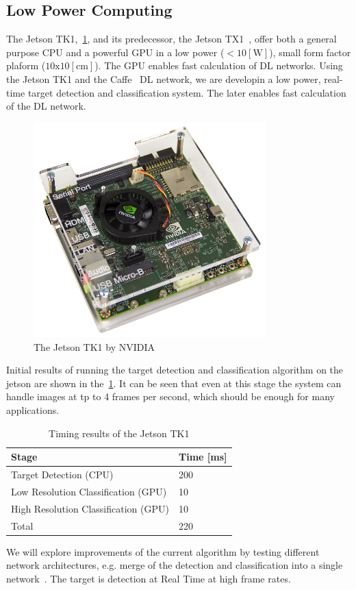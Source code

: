 \documentclass{article} %
\begin{document}
\subsection{Low Power Computing}

The Jetson TK1,~\cref{fig:jetson}, and its predecessor, the Jetson TX1~\cite{jetsontk}, offer
both a general purpose CPU and a powerful GPU in a low power
($<10[\textrm{W}]$), small form factor plaform ($10\textrm{x}10[\textrm{cm}]$).
The GPU enables fast calculation of DL networks. Using the Jetson TK1 and the
Caffe~\cite{jia2014caffe} DL network, we are developin a low power, real-time
target detection and classification system. The later enables fast calculation
of the DL network.
\begin{figure}[h]
	\centering
	\includegraphics[width=0.8\textwidth]{jetson}
	\caption{The Jetson TK1 by NVIDIA}
	\label{fig:jetson}
\end{figure}

Initial results of running the target detection and classification algorithm on
the jetson are shown in the~\cref{tb:jetson1}. It can be seen that even at this
stage the system can handle images at tp to 4 frames per second, which should be
enough for many applications.
\begin{table}
	\centering
	\begin{tabular}{ | l | l | }
		\hline
		Stage 										& Time [ms] 	\\ \hline
		Target Detection (CPU) 						& 200      		\\ \hline
		Low Resolution Classification (GPU) 		& 10 			\\ \hline
		High Resolution Classification (GPU)		& 10 			\\ \hline
		Total 						 				& 220 			\\ \hline
	\end{tabular}
	\caption{Timing results of the Jetson TK1}
	\label{tb:jetson1}
\end{table}
We will explore improvements of the current algorithm by testing different
network architectures, e.g. merge of the detection and classification into a
single network~\cite{long2014fully}. The target is detection at Real Time at
high frame rates.
\end{document}
